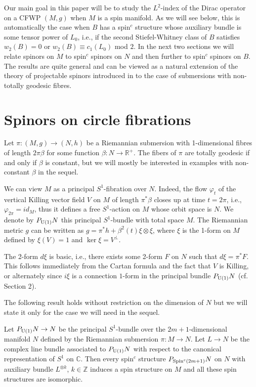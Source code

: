 \documentclass[12pt]{amsart}
\begin{document}
Our main goal in this paper will be to study the $L^2$-index 
of the Dirac operator on a CFWP $(M,g)$ when $M$ is a spin manifold. 
As we will see below, this is automatically the case when $B$ has 
a spin$^c$ structure whose auxiliary bundle is some tensor power of 
$L_0$, i.e., if the second Stiefel-Whitney class of $B$ satisfies
$w_2(B)=0$ or $w_2(B)\equiv c_1(L_0)$ mod $2$. In the next two 
sections we will relate spinors on $M$ to spin$^c$ spinors on $N$ and 
then further to spin$^c$ spinors on $B$. The results are quite general 
and can be viewed as a natural extension of the theory of projectable spinors 
introduced in \cite{m95} to the case of submersions with non-totally 
geodesic fibres.

\section{Spinors on circle fibrations}\label{sect3}

Let $\pi:(M,g)\to (N,h)$ be a Riemannian submersion with 1-dimensional fibres
of length $2\pi{\beta}$ for some function ${\beta}:N\to{{\mathbb R}}^+$. 
The fibers of $\pi$ are totally geodesic if and only if ${\beta}$ is constant, 
but we will mostly be interested in examples with non-constant ${\beta}$ 
in the sequel. 

We can view $M$ as a principal $S^1$-fibration over $N$. Indeed, the flow 
${\varphi}_t$ of the vertical Killing vector field $V$ on $M$ of length $\pi^*{\beta}$ 
closes up at time $t=2\pi$, i.e., ${\varphi}_{2\pi}=id_M$, thus it defines a free 
$S^1$-action on $M$ whose orbit space is $N$. We denote by
${P_{{{\rm U}}(1)}N}$ this principal $S^1$-bundle with total space $M$.
The Riemannian metric $g$ can be written as $g=\pi^*h+{\beta}^2(t)\xi\otimes\xi$, 
where $\xi$ is the 1-form on $M$ defined by $\xi(V)=1$ and $\ker \xi=V^\perp$.

The 2-form $d\xi$ is basic, i.e., there exists some 2-form $F$ on $N$ such that
$d\xi=\pi^*F$. This follows immediately from the Cartan formula 
and the fact that $V$ is Killing, or alternately since $i\xi$ is 
a connection $1$-form in the principal bundle ${P_{{{\rm U}}(1)}N}$ (cf. Section 2).

The following result holds without restriction on the dimension of $N$ 
but we will state it only for the case we will need in the sequel.

\begin{lemma}\label{pb} Let ${P_{{{\rm U}}(1)}N}\to N$ be the principal $S^1$-bundle over 
the $2m+1$-dimensional manifold $N$
defined by the Riemannian submersion $\pi:M\to N$. Let $L\to N$ be the
complex line bundle associated to ${P_{{{\rm U}}(1)}N}$ with respect to the canonical
representation of $S^1$ on ${{\mathbb C}}$. Then every
spin$^c$ structure ${P_{{{\rm Spin}}^c(2m+1)}N}$ on $N$ with auxiliary bundle $L^{\otimes k}$, 
$k\in {{\mathbb Z}}$ induces
a spin structure on $M$ and all these spin structures are isomorphic.
\end{lemma}
\end{document}
